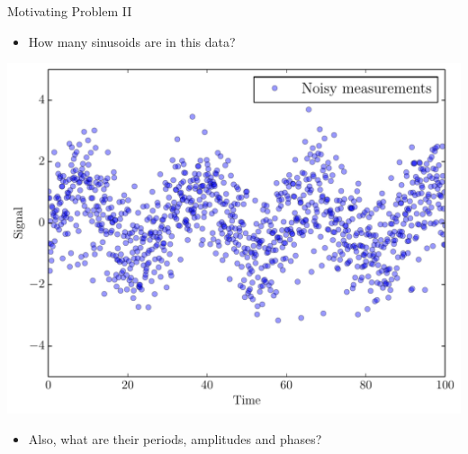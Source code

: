 \begin{frame}[t]{Motivating Problem II}
\begin{itemize}
\item How many sinusoids are in this data?
\end{itemize}
\begin{center}
\includegraphics[scale=0.35]{sinewave_data.pdf}
\end{center}
\begin{itemize}
\item Also, what are their periods, amplitudes and phases?
\end{itemize}
\end{frame}

